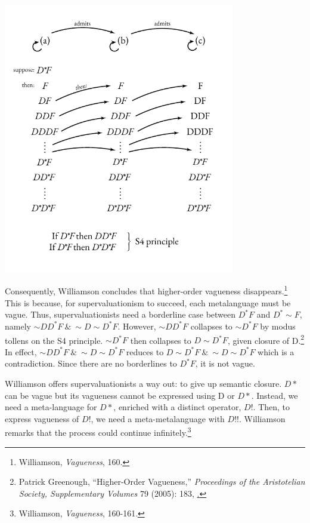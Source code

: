 \begin{center}
\includegraphics[width=3.97674in,height=4.66543in]{papers/figures/2-1.pdf}
\end{center}
Consequently, Williamson concludes that higher-order vagueness
disappears.\footnote{Williamson, \emph{Vagueness}, 160.} This is
because, for supervaluationism to succeed, each metalanguage must be
vague. Thus, supervaluationists need a borderline case between
$D^{*}F$ and $D^{*}{\sim}F$, namely
${{\sim}DD}^{*}F \ \& \ {\sim}D{\sim}D^{*}F$. However, ${{\sim}DD}^{*}F$
collapses to ${{\sim}D}^{*}F$ by modus tollens on the S4 principle. ${{\sim}D}^{*}F$ then collapses to ${D\sim D}^{*}F$, given closure of
D.\footnote{Patrick Greenough, ``Higher-Order Vagueness,''
  \emph{Proceedings of the Aristotelian Society, Supplementary Volumes}
  79 (2005): 183,
  \href{http://www.jstor.org/stable/4106939}.}
In effect, ${{\sim}DD}^{*}F \ \& \ {\sim}D{\sim}D^{*}F$ reduces to ${D{\sim}D}^{*}F \ \& \ {\sim}D{\sim}D^{*}F$ which is a contradiction.
Since there are no borderlines to $D^{*}F$, it is not vague.

Williamson offers supervaluationists a way out: to give up semantic
closure. $D*$ can be vague but its vagueness cannot be expressed using D
or $D*$. Instead, we need a meta-language for $D*$, enriched with a distinct
operator, $D!$. Then, to express vagueness of $D!$, we need a
meta-metalanguage with $D!!$. Williamson remarks that the process could
continue infinitely.\footnote{Williamson, \emph{Vagueness}, 160-161.}

